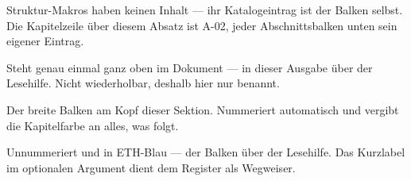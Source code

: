 \ZSFNewColumn
{}

\begin{runintext}
  Struktur-Makros haben keinen Inhalt — ihr Katalogeintrag ist der Balken
  selbst. Die Kapitelzeile über diesem Absatz ist A-02, jeder Abschnittsbalken
  unten sein eigener Eintrag.
\end{runintext}

\begin{defbox}[A-01 · ZSFTitleHeader][weight=quiet]
  Steht genau einmal ganz oben im Dokument — in dieser Ausgabe über der
  Lesehilfe. Nicht wiederholbar, deshalb hier nur benannt.
\end{defbox}

\begin{defbox}[A-02 · StartChapter][weight=quiet]
  Der breite Balken am Kopf dieser Sektion. Nummeriert automatisch und
  vergibt die Kapitelfarbe an alles, was folgt.
\end{defbox}

\begin{defbox}[A-03 · StartFrontChapter][weight=quiet]
  Unnummeriert und in ETH-Blau — der Balken über der Lesehilfe. Das
  Kurzlabel im optionalen Argument dient dem Register als Wegweiser.
\end{defbox}


\begin{defbox}[][weight=quiet]
  \Muster
\end{defbox}


\begin{defbox}[][weight=quiet]
  \Muster
\end{defbox}


\begin{defbox}[][weight=quiet]
  \Muster
\end{defbox}

